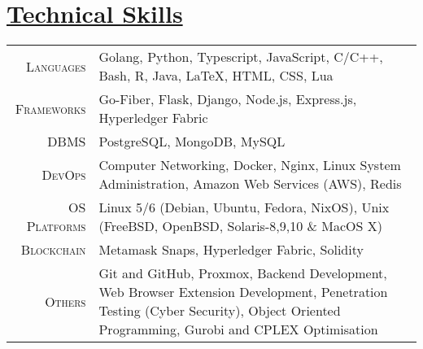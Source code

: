 \documentclass[a4paper,10pt]{extarticle} %
\begin{document}
\begin{itemize}[leftmargin=0.55cm, rightmargin=0.2cm, label={\Large\textbullet}]

\end{itemize}

 \vspace{+0.4cm} \section{\textcolor{primary}{\href{https://www.github.com/proffapt/bodhitree}{Technical Skills}}}

 \vspace{+0.2cm}

 \begin{tabular}{r|p{15cm}}
 \textsc{Languages} & Golang, Python, Typescript, JavaScript, C/C++, Bash, R, Java, LaTeX, HTML, CSS, Lua\\
 \textsc{Frameworks} & Go-Fiber, Flask, Django, Node.js, Express.js, Hyperledger Fabric \\
 \textsc{DBMS} & PostgreSQL, MongoDB, MySQL \\
 \textsc{DevOps} & Computer Networking, Docker, Nginx, Linux System Administration, Amazon Web Services (AWS), Redis \\
 \textsc{OS Platforms} & Linux 5/6 (Debian, Ubuntu, Fedora, NixOS), Unix (FreeBSD, OpenBSD, Solaris-8,9,10 \& MacOS X) \\
 \textsc{Blockchain} & Metamask Snaps, Hyperledger Fabric, Solidity \\
 \textsc{Others} & Git and GitHub, Proxmox, Backend Development, Web Browser Extension Development, Penetration Testing (Cyber Security), Object Oriented Programming, Gurobi and CPLEX Optimisation \\
 
 
\end{tabular}

\end{document}
